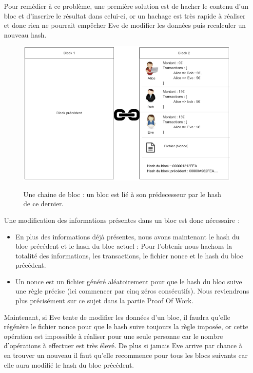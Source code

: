 \documentclass[12pt, a4paper, oneside]{book}
\begin{document}
    Pour remédier à ce problème, une première solution est de hacher le contenu d’un bloc et d’inscrire le résultat dans celui-ci, or un hachage est très rapide à réaliser et donc rien ne pourrait empêcher Eve de modifier les données puis recalculer un nouveau hash.

    \begin{figure}[H]
        \begin{center}
          \includegraphics[width=.98\textwidth]{images/chaine.png}
          \label{fig:chaine}
          \caption{Une chaine de bloc : un bloc est lié à son prédecesseur par le hash de ce dernier.}
        \end{center}
    \end{figure}
    Une modification des informations présentes dans un bloc est donc nécessaire :
    \\
    \begin{itemize}
        \item En plus des informations déjà présentes, nous avons maintenant le hash du bloc précédent et le hash du bloc actuel : Pour l’obtenir nous hachons la totalité des informations, les transactions, le fichier nonce et le hash du bloc précédent.
        \item Un nonce est un fichier généré aléatoirement pour que le hash du bloc suive une règle précise (ici commencer par cinq zéros consécutifs). Nous reviendrons plus précisément sur ce sujet dans la partie Proof Of Work.
    \end{itemize}


    Maintenant, si Eve tente de modifier les données d’un bloc, il faudra qu’elle régénère le fichier nonce pour que le hash suive toujours la règle imposée, or cette opération est impossible à réaliser pour une seule personne car le nombre d’opérations à effectuer est très élevé. De plus si jamais Eve arrive par chance à en trouver un nouveau il faut qu’elle recommence pour tous les blocs suivants car elle aura modifié le hash du bloc précédent.
\end{document}
